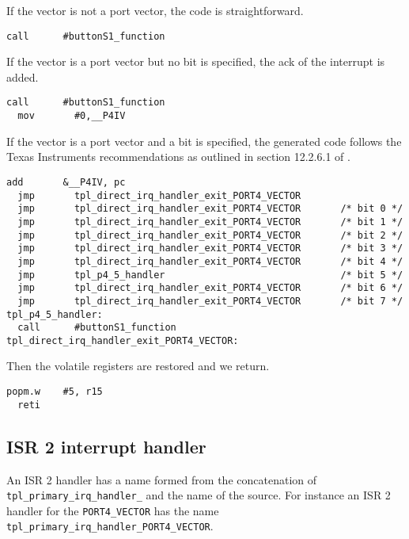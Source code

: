\documentclass[11pt, oneside]{article}   	%
\begin{document}
If the vector is not a port vector, the code is straightforward.

\begin{lstlisting}[basicstyle=\footnotesize\ttfamily]
  call      #buttonS1_function
\end{lstlisting}

If the vector is a port vector but no bit is specified, the ack of the interrupt is added.

\begin{lstlisting}[basicstyle=\footnotesize\ttfamily]
  call      #buttonS1_function
  mov       #0,__P4IV
\end{lstlisting}

If the vector is a port vector and a bit is specified, the generated code follows the Texas Instruments recommendations as outlined in section 12.2.6.1 of \cite{slau367o}.

\begin{lstlisting}[basicstyle=\footnotesize\ttfamily]
  add       &__P4IV, pc
  jmp       tpl_direct_irq_handler_exit_PORT4_VECTOR
  jmp       tpl_direct_irq_handler_exit_PORT4_VECTOR       /* bit 0 */
  jmp       tpl_direct_irq_handler_exit_PORT4_VECTOR       /* bit 1 */ 
  jmp       tpl_direct_irq_handler_exit_PORT4_VECTOR       /* bit 2 */
  jmp       tpl_direct_irq_handler_exit_PORT4_VECTOR       /* bit 3 */
  jmp       tpl_direct_irq_handler_exit_PORT4_VECTOR       /* bit 4 */
  jmp       tpl_p4_5_handler                               /* bit 5 */
  jmp       tpl_direct_irq_handler_exit_PORT4_VECTOR       /* bit 6 */
  jmp       tpl_direct_irq_handler_exit_PORT4_VECTOR       /* bit 7 */
tpl_p4_5_handler:
  call      #buttonS1_function
tpl_direct_irq_handler_exit_PORT4_VECTOR:
\end{lstlisting}

Then the volatile registers are restored and we return.

\begin{lstlisting}[basicstyle=\footnotesize\ttfamily]
  popm.w    #5, r15
  reti
\end{lstlisting}

\subsection{ISR 2 interrupt handler}

An ISR 2 handler has a name formed from the concatenation of \lstinline{tpl_primary_irq_handler_} and the name of the source. For instance an ISR 2 handler for the \lstinline{PORT4_VECTOR} has the name \lstinline{tpl_primary_irq_handler_PORT4_VECTOR}.
\end{document}
